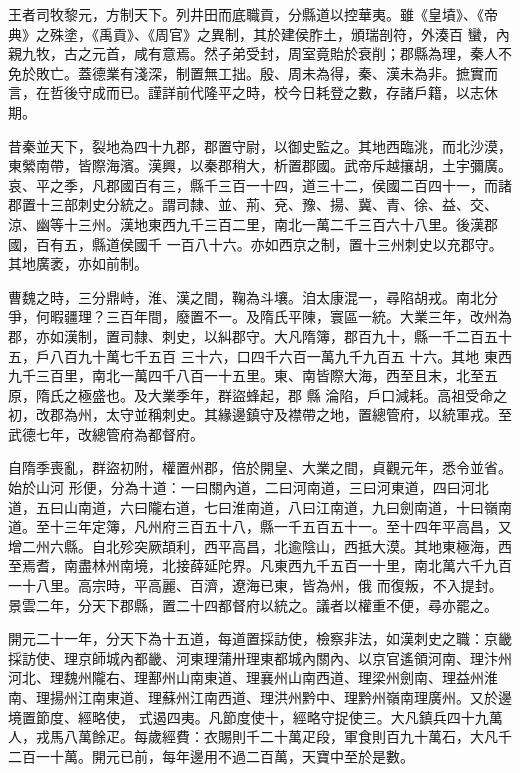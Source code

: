 
\begin{pinyinscope}

 王者司牧黎元，方制天下。列井田而底職貢，分縣道以控華夷。雖《皇墳》、《帝典》之殊塗，《禹貢》、《周官》之異制，其於建侯胙土，頒瑞剖符，外湊百
 蠻，內親九牧，古之元首，咸有意焉。然子弟受封，周室竟貽於衰削；郡縣為理，秦人不免於敗亡。蓋德業有淺深，制置無工拙。殷、周未為得，秦、漢未為非。摭實而言，在哲後守成而已。謹詳前代隆平之時，校今日耗登之數，存諸戶籍，以志休期。



 昔秦並天下，裂地為四十九郡，郡置守尉，以御史監之。其地西臨洮，而北沙漠，東縈南帶，皆際海濱。漢興，以秦郡稍大，析置郡國。武帝斥越攘胡，土宇彌廣。哀、平之季，凡郡國百有三，縣千三百一十四，道三十二，侯國二百四十一，而諸郡置十三部刺史分統之。謂司隸、並、荊、兗、豫、揚、冀、青、徐、益、交、涼、幽等十三州。漢地東西九千三百二里，南北一萬二千三百六十八里。後漢郡國，百有五，縣道侯國千
 一百八十六。亦如西京之制，置十三州刺史以充郡守。其地廣袤，亦如前制。



 曹魏之時，三分鼎峙，淮、漢之間，鞠為斗壤。洎太康混一，尋陷胡戎。南北分爭，何暇疆理？三百年間，廢置不一。及隋氏平陳，寰區一統。大業三年，改州為郡，亦如漢制，置司隸、刺史，以糾郡守。大凡隋簿，郡百九十，縣一千二百五十五，戶八百九十萬七千五百
 三十六，口四千六百一萬九千九百五
 十六。其地
 東西九千三百里，南北一萬四千八百一十五里。東、南皆際大海，西至且末，北至五原，隋氏之極盛也。及大業季年，群盜蜂起，郡
 縣
 淪陷，戶口減耗。高祖受命之初，改郡為州，太守並稱刺史。其緣邊鎮守及襟帶之地，置總管府，以統軍戎。至武德七年，改總管府為都督府。



 自隋季喪亂，群盜初附，權置州郡，倍於開皇、大業之間，貞觀元年，悉令並省。始於山河
 形便，分為十道：一曰關內道，二曰河南道，三曰河東道，四曰河北道，五曰山南道，六曰隴右道，七曰淮南道，八曰江南道，九曰劍南道，十曰嶺南道。至十三年定簿，凡州府三百五十八，縣一千五百五十一。至十四年平高昌，又增二州六縣。自北殄突厥頡利，西平高昌，北逾陰山，西抵大漠。其地東極海，西至焉耆，南盡林州南境，北接薛延陀界。凡東西九千五百一十里，南北萬六千九百一十八里。高宗時，平高麗、百濟，遼海已東，皆為州，俄
 而復叛，不入提封。景雲二年，分天下郡縣，置二十四都督府以統之。議者以權重不便，尋亦罷之。



 開元二十一年，分天下為十五道，每道置採訪使，檢察非法，如漢刺史之職：京畿採訪使、理京師城內都畿、河東理蒲卅理東都城內關內、以京官遙領河南、理汴州河北、理魏州隴右、理鄯州山南東道、理襄州山南西道、理梁州劍南、理益州淮南、理揚州江南東道、理蘇州江南西道、理洪州黔中、理黔州嶺南理廣州。又於邊境置節度、經略使，
 式遏四夷。凡節度使十，經略守捉使三。大凡鎮兵四十九萬人，戎馬八萬餘疋。每歲經費：衣賜則千二十萬疋段，軍食則百九十萬石，大凡千二百一十萬。開元已前，每年邊用不過二百萬，天寶中至於是數。




\end{pinyinscope}
